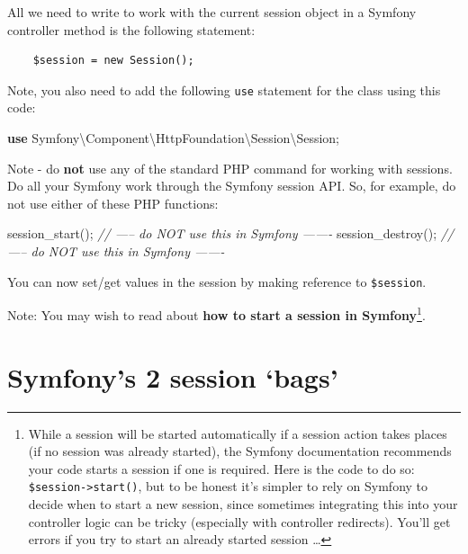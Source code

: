 \documentclass[a4paperpaper,openright]{book}
\newenvironment{Shaded}{}{}
\newcommand{\CommentTok}[1]{\textcolor[rgb]{0.38,0.63,0.69}{\textit{#1}}}
\newcommand{\FunctionTok}[1]{\textcolor[rgb]{0.02,0.16,0.49}{#1}}
\newcommand{\KeywordTok}[1]{\textcolor[rgb]{0.00,0.44,0.13}{\textbf{#1}}}
\newcommand{\NormalTok}[1]{#1}
\newcommand{\OtherTok}[1]{\textcolor[rgb]{0.00,0.44,0.13}{#1}}
\begin{document}
All we need to write to work with the current session object in a
Symfony controller method is the following statement:

\begin{verbatim}
    $session = new Session();
\end{verbatim}

Note, you also need to add the following \texttt{use} statement for the
class using this code:

\begin{Shaded}
\begin{Highlighting}[]
    \KeywordTok{use}\NormalTok{ Symfony\textbackslash{}Component\textbackslash{}HttpFoundation\textbackslash{}Session\textbackslash{}Session}\OtherTok{;}
\end{Highlighting}
\end{Shaded}

Note - do \textbf{not} use any of the standard PHP command for working
with sessions. Do all your Symfony work through the Symfony session API.
So, for example, do not use either of these PHP functions:

\begin{Shaded}
\begin{Highlighting}[]
    \FunctionTok{session_start}\OtherTok{();} \CommentTok{// ----- do NOT use this in Symfony -------}
    \FunctionTok{session_destroy}\OtherTok{();} \CommentTok{// ----- do NOT use this in Symfony -------}
\end{Highlighting}
\end{Shaded}

You can now set/get values in the session by making reference to
\texttt{\$session}.

Note: You may wish to read about \textbf{how to start a session in
Symfony}\footnote{While a session will be started automatically if a
  session action takes places (if no session was already started), the
  Symfony documentation recommends your code starts a session if one is
  required. Here is the code to do so:
  \texttt{\$session-\textgreater{}start()}, but to be honest it's
  simpler to rely on Symfony to decide when to start a new session,
  since sometimes integrating this into your controller logic can be
  tricky (especially with controller redirects). You'll get errors if
  you try to start an already started session \ldots{}}.

\hypertarget{symfonys-2-session-bags}{%
\section{Symfony's 2 session `bags'}\label{symfonys-2-session-bags}}
\end{document}
